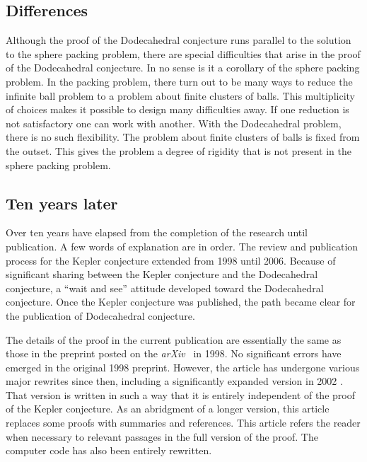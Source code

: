 \documentclass{article} %
\begin{document}
\subsection{Differences}

Although the proof of the Dodecahedral conjecture runs parallel to the
solution to the sphere packing problem, there are special difficulties
that arise in the proof of the Dodecahedral conjecture. In no sense is
it a corollary of the sphere packing problem. In the packing problem,
there turn out to be many ways to reduce the infinite ball problem to
a problem about finite clusters of balls. This multiplicity of choices
makes it possible to design many difficulties away. If one reduction
is not satisfactory one can work with another. With the Dodecahedral
problem, there is no such flexibility. The problem about finite
clusters of balls is fixed from the outset. This gives the problem a
degree of rigidity that is not present in the sphere packing problem.

\subsection{Ten years later}

Over ten years have elapsed from the completion of the research until
publication. A few words of explanation are in order. The review and
publication process for the Kepler conjecture extended from 1998 until
2006. Because of significant sharing between the Kepler conjecture and
the Dodecahedral conjecture, a ``wait and see'' attitude developed
toward the Dodecahedral conjecture. Once the Kepler conjecture was
published, the path became clear for the publication of Dodecahedral
conjecture.

The details of the proof in the current publication are essentially
the same as those in the preprint posted on the
\emph{arXiv}~\cite{website:arXiv} in 1998. No significant errors have
emerged in the original 1998 preprint.
However,
the article has undergone various major rewrites since then, including a significantly expanded version in 2002 \cite{Hales:2002:Dodec}.
That version is written in such a way that it is
entirely independent of the proof of the Kepler conjecture.
As an abridgment of a longer version, this article replaces 
some proofs with summaries and references.   
This article refers the reader when necessary to relevant
passages in the full version of the proof.
The computer code has
also been entirely rewritten.
\end{document}
